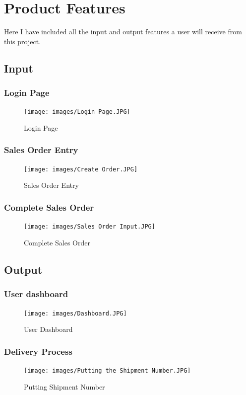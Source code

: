 \section{Product Features}
Here I have included all the input and output features a user will receive from this project.
\subsection{Input}
\subsubsection{Login Page}
\begin{figure} [H]
    \centering
    \texttt{[image: images/Login Page.JPG]}
    \caption{Login Page}
    \label{fig:my_label}
\end{figure} 
\subsubsection{Sales Order Entry}
\begin{figure} [H]
    \centering
    \texttt{[image: images/Create Order.JPG]}
    \caption{Sales Order Entry}
    \label{fig:my_label}
\end{figure} 
\subsubsection{Complete Sales Order}
\begin{figure} [H]
    \centering
    \texttt{[image: images/Sales Order Input.JPG]}
    \caption{Complete Sales Order}
    \label{fig:my_label}
\end{figure}     
\subsection{Output}
\subsubsection{User dashboard}
\begin{figure} [H]
    \centering
    \texttt{[image: images/Dashboard.JPG]}
    \caption{User Dashboard}
    \label{fig:my_label}
\end{figure} 
\subsubsection{Delivery Process}
\begin{figure} [H]
    \centering
    \texttt{[image: images/Putting the Shipment Number.JPG]}
    \caption{Putting Shipment Number}
    \label{fig:my_label}
\end{figure}
